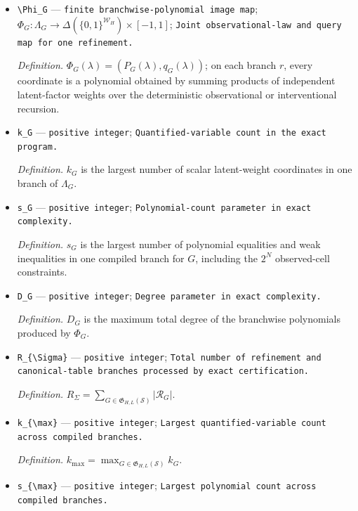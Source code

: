 \documentclass{article}
\begin{document}
\begin{itemize}
  \item \texttt{\textbackslash{}\allowbreak{}Phi\_\allowbreak{}G} --- \texttt{finite branchwise-\allowbreak{}polynomial image map}; \(\Phi_G:\Lambda_G\to\Delta(\{0,1\}^{\mathcal W_H})\times[-1,1]\); \texttt{Joint observational-\allowbreak{}law and query map for one refinement.}
  \par\smallskip\noindent\emph{Definition.} \(\Phi_G(\lambda)=(P_G(\lambda),q_G(\lambda))\); on each branch \(r\), every coordinate is a polynomial obtained by summing products of independent latent-factor weights over the deterministic observational or interventional recursion.
  \item \texttt{k\_\allowbreak{}G} --- \texttt{positive integer}; \texttt{Quantified-\allowbreak{}variable count in the exact program.}
  \par\smallskip\noindent\emph{Definition.} \(k_G\) is the largest number of scalar latent-weight coordinates in one branch of \(\Lambda_G\).
  \item \texttt{s\_\allowbreak{}G} --- \texttt{positive integer}; \texttt{Polynomial-\allowbreak{}count parameter in exact complexity.}
  \par\smallskip\noindent\emph{Definition.} \(s_G\) is the largest number of polynomial equalities and weak inequalities in one compiled branch for \(G\), including the \(2^N\) observed-cell constraints.
  \item \texttt{D\_\allowbreak{}G} --- \texttt{positive integer}; \texttt{Degree parameter in exact complexity.}
  \par\smallskip\noindent\emph{Definition.} \(D_G\) is the maximum total degree of the branchwise polynomials produced by \(\Phi_G\).
  \item \texttt{R\_\allowbreak{}\{\textbackslash{}\allowbreak{}Sigma\}\allowbreak{}} --- \texttt{positive integer}; \texttt{Total number of refinement and canonical-\allowbreak{}table branches processed by exact certification.}
  \par\smallskip\noindent\emph{Definition.} \(R_{\Sigma}=\sum_{G\in\mathfrak G_{H,L}(\mathcal S)}|\mathcal R_G|\).
  \item \texttt{k\_\allowbreak{}\{\textbackslash{}\allowbreak{}max\}\allowbreak{}} --- \texttt{positive integer}; \texttt{Largest quantified-\allowbreak{}variable count across compiled branches.}
  \par\smallskip\noindent\emph{Definition.} \(k_{\max}=\max_{G\in\mathfrak G_{H,L}(\mathcal S)}k_G\).
  \item \texttt{s\_\allowbreak{}\{\textbackslash{}\allowbreak{}max\}\allowbreak{}} --- \texttt{positive integer}; \texttt{Largest polynomial count across compiled branches.}

\end{itemize}
\end{document}

